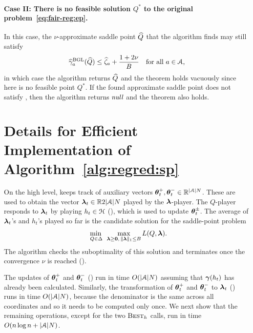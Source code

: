 \paragraph{Case II: There is no feasible solution $Q^*$ to the original problem~\eqref{eq:fair-reg:ep}.} In this case, the $\nu$-approximate saddle point $\widehat{Q}$ that the algorithm finds may still satisfy
%
\begin{equation}
\label{eq:ep:app:7}
  \widehat{\gamma}^{\textup{BGL}}_a(\widehat{Q})\le\widehat{\zeta}_a + \frac{1+2\nu}{B}
  \quad
  \text{for all $a\in\mathcal{A}$,}
\end{equation}
%
in which case the algorithm returns $\widehat{Q}$ and the theorem holds vacuously since here is no feasible point $Q^*$. If the found approximate saddle point does not satisfy , then the algorithm returns $\textit{\mdseries null}$ and the theorem also holds.

\section{Details for Efficient Implementation of Algorithm~\ref{alg:regred:sp}}
\label{sec:app:impl}

On the high level,  keeps track of auxiliary vectors $\boldsymbol{\theta}_t^+,\boldsymbol{\theta}_t^-\in\mathbb{R}^{\lvert\mathcal{A}\rvert N}$. These are used to obtain the vector $\boldsymbol{\lambda}_t\in\mathbb{R}{2\lvert\mathcal{A}\rvert N}$ played by the $\boldsymbol{\lambda}$-player. The $Q$-player responds to $\boldsymbol{\lambda}_t$ by playing $h_t\in\mathcal{H}$ (), which is used to update $\boldsymbol{\theta}_t^\pm$. The average of $\boldsymbol{\lambda}_t$'s and $h_t$'s played so far is the candidate solution for the saddle-point problem
%
\begin{equation}
\label{eq:minmax}
\adjustlimits\min_{\;\;Q\in\Delta\;\;}\max_{\vlambda\ge\vzero,\,\norm{\vlambda}_1\le B} L(Q,\vlambda).
\end{equation}
%
The algorithm checks the suboptimality of this solution and terminates once the convergence $\nu$ is reached ().


The updates of
$\boldsymbol{\theta}_t^+$ and $\boldsymbol{\theta}_t^-$ () run in time $O(\lvert\mathcal{A}\rvert N)$ assuming that $\boldsymbol{\gamma}(h_t)$ has already been calculated. Similarly, the transformation of $\boldsymbol{\theta}_t^+$ and $\boldsymbol{\theta}_t^-$ to $\boldsymbol{\lambda}_t$ () runs in time $O(\lvert\mathcal{A}\rvert N)$, because the denominator is the same across all coordinates and so it needs to be computed only once. We next show that the remaining operations, except for the two $\textsc{\mdseries Best}_h$ calls, run in time $O(n\log n+\lvert\mathcal{A}\rvert N)$.

